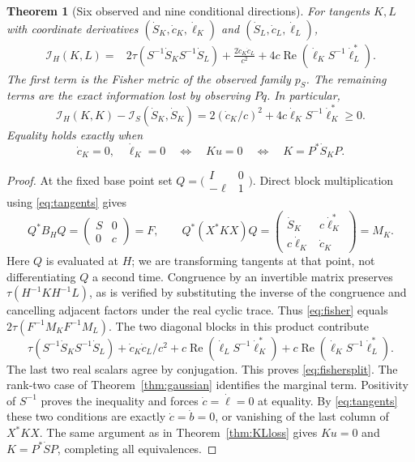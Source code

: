 \documentclass[11pt,a4paper]{article}
\numberwithin{equation}{section}
\newtheorem{theorem}{Theorem}[section]
\theoremstyle{definition}
\theoremstyle{remark}
\newcommand{\Rea}{\operatorname{Re}}
\newcommand{\FI}{\mathcal I}
\newcommand{\rtr}{\tau}
\begin{document}
\begin{theorem}[Six observed and nine conditional directions]\label{thm:Fisherloss}
For tangents $K,L$ with coordinate derivatives
$(\dot S_K,\dot c_K,\dot\ell_K)$ and
$(\dot S_L,\dot c_L,\dot\ell_L)$,
\begin{align}
\FI_H(K,L)={}&2\rtr(S^{-1}\dot S_K S^{-1}\dot S_L)
 +\frac{2\dot c_K\dot c_L}{c^2}
 +4c\Rea(\dot\ell_K S^{-1}\dot\ell_L^*).
\label{eq:fishersplit}
\end{align}
The first term is the Fisher metric of the observed family $p_S$.
The remaining terms are the exact information lost by observing $Pq$.
In particular,
\begin{equation}\label{eq:fisherloss}
\FI_H(K,K)-\FI_S(\dot S_K,\dot S_K)
=2(\dot c_K/c)^2+4c\dot\ell_K S^{-1}\dot\ell_K^*\ge0.
\end{equation}
Equality holds exactly when
\begin{equation}\label{eq:fisherzero}
\dot c_K=0,\quad\dot\ell_K=0
\quad\Longleftrightarrow\quad Ku=0
\quad\Longleftrightarrow\quad K=P^*\dot S_KP.
\end{equation}
\end{theorem}
\begin{proof}
At the fixed base point set
$Q=\bigl(\begin{smallmatrix}I&0\\-\ell&1\end{smallmatrix}\bigr)$.
Direct block multiplication using \eqref{eq:tangents} gives
\begin{equation}\label{eq:whitenedblocks}
Q^*B_HQ=\begin{pmatrix}S&0\\0&c\end{pmatrix}=F,
\qquad
Q^*(X^*KX)Q
=\begin{pmatrix}\dot S_K&c\dot\ell_K^*\\c\dot\ell_K&\dot c_K\end{pmatrix}=M_K.
\end{equation}
Here $Q$ is evaluated at $H$; we are transforming tangents at that
point, not differentiating $Q$ a second time. Congruence by an invertible
matrix preserves $\rtr(H^{-1}KH^{-1}L)$, as is verified by substituting
the inverse of the congruence and cancelling adjacent factors under
the real cyclic trace. Thus \eqref{eq:fisher} equals
$2\rtr(F^{-1}M_KF^{-1}M_L)$.
The two diagonal blocks in this product contribute
\[
\rtr(S^{-1}\dot S_KS^{-1}\dot S_L)
+\dot c_K\dot c_L/c^2
+c\Rea(\dot\ell_LS^{-1}\dot\ell_K^*)
+c\Rea(\dot\ell_KS^{-1}\dot\ell_L^*).
\]
The last two real scalars agree by conjugation. This proves
\eqref{eq:fishersplit}. The rank-two case of Theorem~\ref{thm:gaussian}
identifies the marginal term. Positivity of $S^{-1}$ proves the
inequality and forces $\dot c=\dot\ell=0$ at equality.
By \eqref{eq:tangents} these two conditions are exactly $\dot c=\dot b=0$,
or vanishing of the last column of $X^*KX$. The same argument as in
Theorem~\ref{thm:KLloss} gives $Ku=0$ and
$K=P^*\dot S P$, completing all equivalences.
\end{proof}
\end{document}
